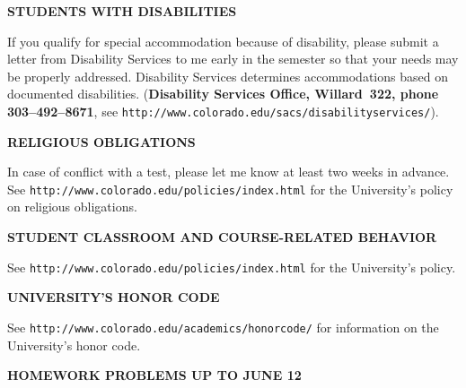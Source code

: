 \documentclass[10pt]{article}
\begin{document}
\newpage

\textbf{\normalsize STUDENTS WITH DISABILITIES}

If you qualify for special accommodation because of disability, please submit
a letter from Disability Services to me early in the semester so that your
needs may be properly addressed.
Disability Services determines accommodations based on documented disabilities.
(\textbf{Disability Services Office, Willard~322, phone 303--492--8671},
see \texttt{http://www.colorado.edu/sacs/disabilityservices/}).


\medskip

\textbf{\normalsize RELIGIOUS OBLIGATIONS}

In case of conflict with a test, please let me know at least two weeks in
advance.
\\
See \texttt{http://www.colorado.edu/policies/index.html}
for the University's policy on religious obligations.


\medskip

\textbf{\normalsize STUDENT CLASSROOM AND COURSE-RELATED BEHAVIOR}

See \texttt{http://www.colorado.edu/policies/index.html} for the University's 
policy.


\medskip

\textbf{\normalsize UNIVERSITY'S HONOR CODE}

See \texttt{http://www.colorado.edu/academics/honorcode/}
for information on the University's honor code.


\bigskip \bigskip \bigskip \bigskip 

\centerline{\Large \bf HOMEWORK PROBLEMS UP TO JUNE 12}

\bigskip \bigskip 
\end{document}
